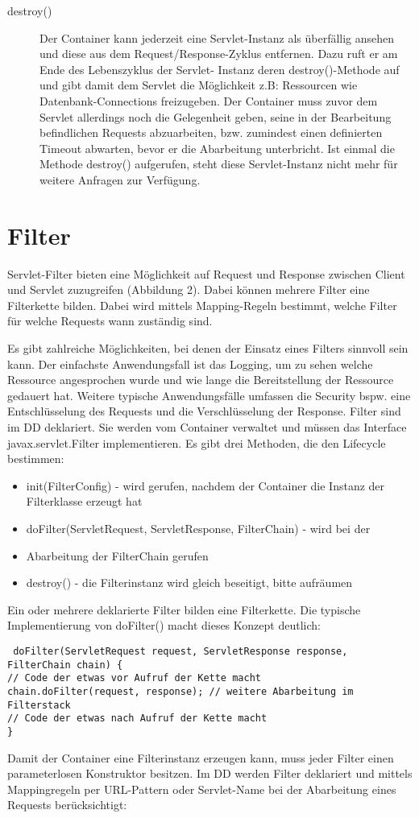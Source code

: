 \documentclass[a4paper,10pt]{scrreprt}
\begin{document}
\begin{description}
\item[destroy()] Der Container kann jederzeit eine Servlet-Instanz als überfällig ansehen und diese aus
dem Request/Response-Zyklus entfernen. Dazu ruft er am Ende des Lebenszyklus der Servlet-
Instanz deren destroy()-Methode auf und gibt damit dem Servlet die Möglichkeit z.B: Ressourcen
wie Datenbank-Connections freizugeben. Der Container muss zuvor dem Servlet allerdings noch die
Gelegenheit geben, seine in der Bearbeitung befindlichen Requests abzuarbeiten, bzw. zumindest
einen definierten Timeout abwarten, bevor er die Abarbeitung unterbricht.
Ist einmal die Methode destroy() aufgerufen, steht diese Servlet-Instanz nicht mehr für weitere
Anfragen zur Verfügung.
\end{description}

\section{Filter}
Servlet-Filter bieten eine Möglichkeit auf Request und Response zwischen Client und Servlet
zuzugreifen (Abbildung 2). Dabei können mehrere Filter eine Filterkette bilden. Dabei wird mittels
Mapping-Regeln bestimmt, welche Filter für welche Requests wann zuständig sind.

Es gibt zahlreiche Möglichkeiten, bei denen der Einsatz eines Filters sinnvoll sein kann. Der
einfachste Anwendungsfall ist das Logging, um zu sehen welche Ressource angesprochen wurde
und wie lange die Bereitstellung der Ressource gedauert hat. Weitere typische Anwendungsfälle
umfassen die Security bspw. eine Entschlüsselung des Requests und die Verschlüsselung der
Response.
Filter sind im DD deklariert. Sie werden vom Container verwaltet und müssen das
Interface javax.servlet.Filter implementieren. Es gibt drei Methoden, die den Lifecycle
bestimmen:
\begin{itemize}
 \item  init(FilterConfig) - wird gerufen, nachdem der Container die Instanz der Filterklasse
erzeugt hat
\item doFilter(ServletRequest, ServletResponse, FilterChain) - wird bei der
\item Abarbeitung der FilterChain gerufen
\item destroy() - die Filterinstanz wird gleich beseitigt, bitte aufräumen
\end{itemize}
Ein oder mehrere deklarierte Filter bilden eine Filterkette. Die typische Implementierung
von doFilter() macht dieses Konzept deutlich:
\begin{verbatim}
 doFilter(ServletRequest request, ServletResponse response, FilterChain chain) {
// Code der etwas vor Aufruf der Kette macht
chain.doFilter(request, response); // weitere Abarbeitung im Filterstack
// Code der etwas nach Aufruf der Kette macht
}
\end{verbatim}
Damit der Container eine Filterinstanz erzeugen kann, muss jeder Filter einen parameterlosen
Konstruktor besitzen.
Im DD werden Filter deklariert und mittels Mappingregeln per URL-Pattern oder Servlet-Name bei
der Abarbeitung eines Requests berücksichtigt:
\end{document}
